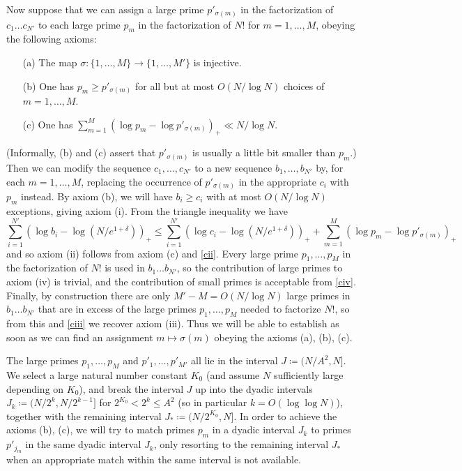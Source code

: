 \documentclass[12pt,a4paper,reqno]{amsart}
\numberwithin{equation}{section}
\theoremstyle{plain}
\theoremstyle{definition}
\begin{document}
Now suppose that we can assign a large prime $p'_{\sigma(m)}$ in the factorization of $c_1 \dots c_{N'}$ to each large prime $p_m$ in the factorization of $N!$ for $m=1,\dots,M$, obeying the following axioms:
\begin{itemize}
\item[(a)]  The map $\sigma \colon\{1,\dots,M\} \to\{1,\dots,M'\}$ is injective.
\item[(b)]  One has $p_m \geq p'_{\sigma(m)}$ for all but at most $O(N/\log N)$ choices of $m = 1,\dots,M$.
\item[(c)] One has $\sum_{m=1}^M (\log p_m - \log p'_{\sigma(m)})_+ \ll N/\log N$.
\end{itemize}
(Informally, (b) and (c) assert that $p'_{\sigma(m)}$ is usually a little bit smaller than $p_m$.)  Then we can modify the sequence $c_1,\dots,c_{N'}$ to a new sequence $b_1,\dots,b_{N'}$ by, for each $m=1,\dots,M$, replacing the occurrence of $p'_{\sigma(m)}$ in the appropriate $c_i$ with $p_m$ instead.  By axiom (b), we will have $b_i \geq c_i$ with at most $O(N/\log N)$ exceptions, giving axiom (i).  From the triangle inequality we have
$$ \sum_{i=1}^{N'} (\log b_i - \log (N/e^{1+\delta}))_+ \leq \sum_{i=1}^{N'} (\log c_i - \log (N/e^{1+\delta}))_+ + \sum_{m=1}^M (\log p_m - \log p'_{\sigma(m)})_+$$
and so axiom (ii) follows from axiom (c) and \eqref{cii}.  Every large prime $p_1,\dots,p_M$ in the factorization of $N!$ is used in $b_1 \dots b_{N'}$, so the contribution of large primes to axiom (iv) is trivial, and the contribution of small primes is acceptable from \eqref{civ}.  Finally, by construction there are only $M'-M = O(N/\log N)$ large primes in $b_1 \dots b_{N'}$ that are in excess of the large primes $p_1,\dots,p_M$ needed to factorize $N!$, so from this and \eqref{ciii} we recover axiom (iii).  Thus we will be able to establish  as soon as we can find an assignment $m \mapsto \sigma(m)$ obeying the axioms (a), (b), (c).

The large primes $p_1,\dots,p_M$ and $p'_1,\dots,p'_{M'}$ all lie in the interval $J \coloneqq (N/A^2, N]$.  We select a large natural number constant $K_0$ (and assume $N$ sufficiently large depending on $K_0$), and break the interval $J$ up into the dyadic intervals $J_k \coloneqq (N/2^k, N/2^{k-1}]$ for $2^{K_0} < 2^k \leq A^2$ (so in particular $k=O(\log\log N)$), together with the remaining interval $J_* \coloneqq (N/2^{K_0},N]$.  In order to achieve the axioms (b), (c), we will try to match primes $p_m$ in a dyadic interval $J_k$ to primes $p'_{j_m}$ in the same dyadic interval $J_k$, only resorting to the remaining interval $J_*$ when an appropriate match within the same interval is not available.
\end{document}
